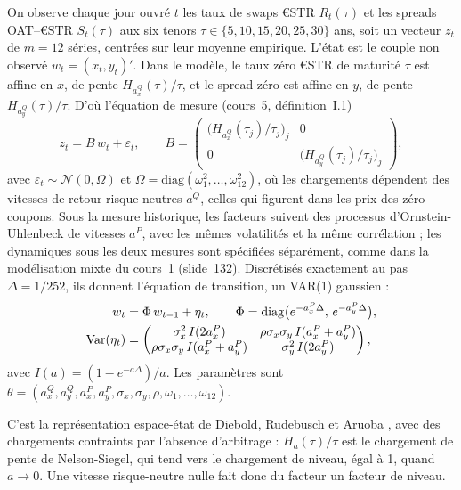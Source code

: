 On observe chaque jour ouvré $t$ les taux de swaps €STR $R_t(\tau)$ et les spreads OAT–€STR $S_t(\tau)$ aux six
tenors $\tau \in \{5, 10, 15, 20, 25, 30\}$ ans, soit un vecteur $z_t$ de $m = 12$ séries, centrées sur leur moyenne
empirique. L'état est le couple non observé $w_t = (x_t, y_t)'$. Dans le modèle, le taux zéro €STR de maturité
$\tau$ est affine en $x$, de pente $H_{a_x^Q}(\tau)/\tau$, et le spread zéro est affine en $y$, de pente
$H_{a_y^Q}(\tau)/\tau$. D'où l'équation de mesure (cours~5, définition~I.1)
\begin{equation}
z_t = B\,w_t + \varepsilon_t,\qquad
B = \begin{pmatrix} \big(H_{a_x^Q}(\tau_j)/\tau_j\big)_j & 0 \\ 0 & \big(H_{a_y^Q}(\tau_j)/\tau_j\big)_j \end{pmatrix},
\end{equation}
avec $\varepsilon_t \sim \mathcal N(0,\Omega)$ et $\Omega = \mathrm{diag}(\omega_1^2, \dots, \omega_{12}^2)$,
où les chargements dépendent des vitesses de retour risque-neutres $a^Q$, celles qui figurent dans les prix des
zéro-coupons. Sous la mesure historique, les facteurs suivent des processus d'Ornstein-Uhlenbeck de vitesses
$a^P$, avec les mêmes volatilités et la même corrélation ; les dynamiques sous les deux mesures sont spécifiées
séparément, comme dans la modélisation mixte du cours~1 (slide~132). Discrétisés exactement au pas
$\Delta = 1/252$, ils donnent l'équation de transition, un VAR(1) gaussien :
\begin{equation}
\begin{split}
w_t &= \Phi\,w_{t-1} + \eta_t,\qquad \Phi = \mathrm{diag}\big(e^{-a_x^P\Delta},\,e^{-a_y^P\Delta}\big),\\
\operatorname{Var}(\eta_t) &= \begin{pmatrix} \sigma_x^2\,I(2a_x^P) & \rho\sigma_x\sigma_y\,I(a_x^P + a_y^P) \\
\rho\sigma_x\sigma_y\,I(a_x^P + a_y^P) & \sigma_y^2\,I(2a_y^P)\end{pmatrix},
\end{split}
\end{equation}
avec $I(a) = (1-e^{-a\Delta})/a$. Les paramètres sont
$\theta = (a_x^Q, a_y^Q, a_x^P, a_y^P, \sigma_x, \sigma_y, \rho, \omega_1, \dots, \omega_{12})$.

C'est la représentation espace-état de Diebold, Rudebusch et Aruoba \citep[cours~3, slides~119-120]{MPR2025},
avec des chargements contraints par l'absence d'arbitrage : $H_a(\tau)/\tau$ est le chargement de pente de
Nelson-Siegel, qui tend vers le chargement de niveau, égal à 1, quand $a \to 0$. Une vitesse risque-neutre nulle
fait donc du facteur un facteur de niveau.

